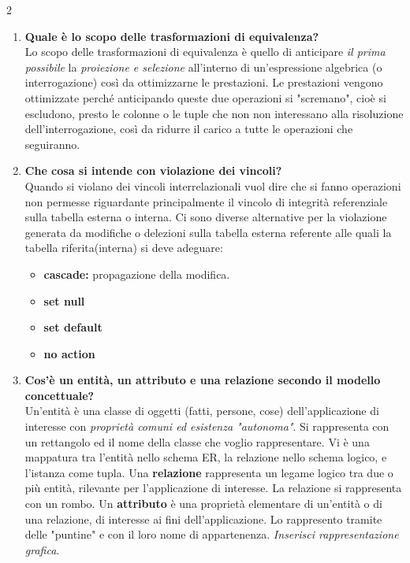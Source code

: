\documentclass{article}
\begin{document}
\begin{multicols}{2}
\begin{enumerate}[leftmargin=*, align=left]
	 Equivalenza \textbf{assoluta:} \begin{align*}
		\Pi_{A,B}(\sigma_{A>0}(R)) \equiv \sigma_{A>0} (\Pi_{A,B}(R))
	\end{align*}
	
	\item \textbf{Quale è lo scopo delle trasformazioni di equivalenza?} \\
	Lo scopo delle trasformazioni di equivalenza è quello di anticipare \textit{il prima possibile} la \emph{proiezione e selezione} all'interno di un'espressione algebrica (o interrogazione) così da ottimizzarne le prestazioni. Le prestazioni vengono ottimizzate perché anticipando queste due operazioni si "scremano", cioè si escludono, presto le colonne o le tuple che non non interessano alla risoluzione dell'interrogazione, così da ridurre il carico a tutte le operazioni che seguiranno.
	
	\item \textbf{Che cosa si intende con violazione dei vincoli?} \\
	Quando si violano dei vincoli interrelazionali vuol dire che si fanno operazioni
	non permesse riguardante principalmente il vincolo di integrità referenziale sulla tabella esterna o interna.
	Ci sono diverse alternative per la violazione generata da modifiche o delezioni sulla tabella esterna referente alle quali la tabella riferita(interna) si deve adeguare:
	\begin{itemize}
		\item \textbf{cascade:} propagazione della modifica.
		\item \textbf{set null}
		\item \textbf{set default}
		\item \textbf{no action}
	\end{itemize}
	
	\item \textbf{Cos'è un entità, un attributo e una relazione secondo il modello concettuale?} \\
	Un'entità è una classe di oggetti (fatti, persone, cose) dell'applicazione di interesse con \textit{proprietà comuni ed esistenza "autonoma"}. Si rappresenta con un rettangolo ed il nome della classe che voglio rappresentare.
	Vi è una mappatura tra l'entità nello schema ER, la relazione nello schema logico, e l'istanza come tupla. Una \textbf{relazione} rappresenta un legame logico tra due o più entità, rilevante per l'applicazione di interesse. La relazione si rappresenta con un rombo.
	Un \textbf{attributo} è una proprietà elementare di un'entità o di una relazione, di interesse ai fini dell'applicazione. Lo rappresento tramite delle "puntine" e con il loro nome di appartenenza.
	\textit{Inserisci rappresentazione grafica}.
	

\end{enumerate}
\end{multicols}
\end{document}
